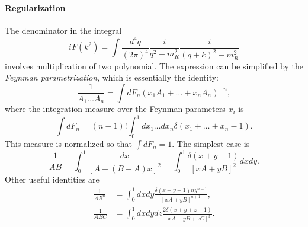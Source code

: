 \documentclass[aps,prb,superscriptaddress,nofootinbib]{revtex4}
\begin{document}
\paragraph*{Regularization}
The denominator in the integral
\begin{equation}
	iF(k^2) = \int \frac{d^4 q}{(2\pi)^4} \frac{i}{q^2-m_R^2} \frac{i}{(q+k)^2-m_R^2}
\end{equation}
involves multiplication of two polynomial.
The expression can be simplified by the \textit{Feynman parametrization}, which is essentially the identity:
\begin{equation}
	\frac{1}{A_{1} \ldots A_{n}}=\int d F_{n}\left(x_{1} A_{1}+\ldots+x_{n} A_{n}\right)^{-n},
\end{equation}
where the integration measure over the Feynman parameters $x_{i}$ is
\begin{equation}
	\int d F_{n}=(n-1) ! \int_{0}^{1} d x_{1} \ldots d x_{n} \delta\left(x_{1}+\ldots+x_{n}-1\right).
\end{equation}
This measure is normalized so that $\int d F_{n} =1$. 
The simplest case is
\begin{equation}
	\frac{1}{A B}=\int_{0}^{1} \frac{dx}{[A+(B-A) x]^{2}}
	=\int_{0}^{1} \frac{\delta(x+y-1)}{[x A+y B]^{2}} dx dy.
\end{equation}
Other useful identities are
\begin{equation}
\begin{aligned}
	\frac{1}{A B^{n}} &=\int_{0}^{1} dxdy\frac{\delta(x+y-1)n y^{n-1}}{[x A+y B]^{n+1}} , \\
	\frac{1}{A B C} &=\int_{0}^{1} dxdydz \frac{2\delta(x+y+z-1)}{[x A+y B+z C]^{3}} .
\end{aligned}
\end{equation}
\end{document}
